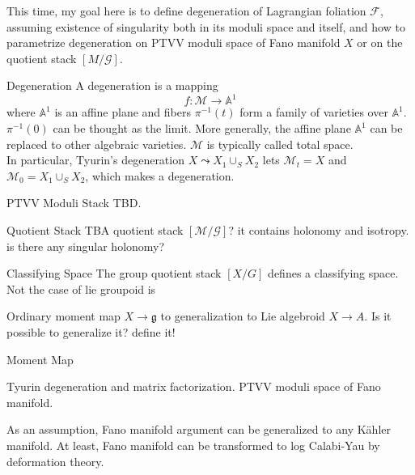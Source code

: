 \documentclass{article}
\begin{document}
\noindent
This time, my goal here is to define degeneration of Lagrangian foliation $\mathcal{F}$, 
assuming existence of singularity both in its moduli space and itself,
and how to parametrize degeneration on PTVV moduli space of Fano manifold $X$ or on the quotient stack $[M/\mathcal{G}]$. \\


\begin{definition}{Degeneration}{}
A degeneration is a mapping 
\[ f: \mathcal{M} \to \mathbb{A}^1 \]
where $\mathbb{A}^1$ is an affine plane and fibers $\pi^{-1}(t)$ form a family of varieties over $\mathbb{A}^1$.
$\pi^{-1}(0)$ can be thought as the limit. More generally, the affine plane $\mathbb{A}^1$ can be replaced to other algebraic varieties. 
$\mathcal{M}$ is typically called total space. \\

In particular, Tyurin's degeneration $X\leadsto X_1 \cup_S X_2$ lets $\mathcal{M}_t = X$ and $\mathcal{M}_0 = X_1 \cup_S X_2$,
which makes a degeneration.
\end{definition}


\begin{definition}{PTVV Moduli Stack}{}
TBD.
\end{definition}


\begin{definition}{Quotient Stack}{}
TBA
quotient stack $[\mathcal{M}/\mathcal{G}]$?
it contains holonomy and isotropy.
is there any singular holonomy?
\end{definition}


\begin{definition} {Classifying Space}{}
The group quotient stack $[X/G]$ defines a classifying space.
Not the case of lie groupoid is
\end{definition}


Ordinary moment map $X \to \mathfrak{g}$ to generalization to Lie algebroid $X \to A$.
Is it possible to generalize it? define it!


\begin{conjecture} {Moment Map}{}
\end{conjecture}

\noindent
Tyurin degeneration and matrix factorization.
PTVV moduli space of Fano manifold.

\begin{remark}{}{}
As an assumption, Fano manifold argument can be generalized to any K\"ahler manifold.
At least, Fano manifold can be transformed to log Calabi-Yau by deformation theory.
\end{remark}
\end{document}
